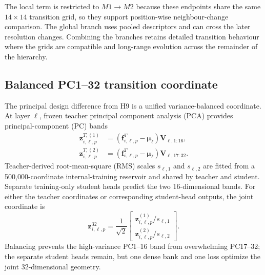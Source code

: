 The local term is restricted to $M1\rightarrow M2$ because these endpoints
share the same $14\times14$ transition grid, so they support position-wise
neighbour-change comparison. The global branch uses pooled descriptors and can
cross the later resolution changes. Combining the branches retains detailed
transition behaviour where the grids are compatible and long-range evolution
across the remainder of the hierarchy.

\subsection{Balanced PC1--32 transition coordinate}

The principal design difference from H9 is a unified variance-balanced
coordinate. At layer $\ell$, frozen teacher principal component analysis (PCA)
provides principal-component (PC) bands
\begin{align}
    \bm z_{i,\ell,p}^{T,(1)}
    &=(\bm f_{i,\ell,p}^T-\bm\mu_\ell)
      \bm V_{\ell,1:16},\\
    \bm z_{i,\ell,p}^{T,(2)}
    &=(\bm f_{i,\ell,p}^T-\bm\mu_\ell)
      \bm V_{\ell,17:32}.
\end{align}
Teacher-derived root-mean-square (RMS) scales $s_{\ell,1}$ and $s_{\ell,2}$ are fitted from a
500,000-coordinate internal-training reservoir and shared by teacher and
student. Separate training-only student heads predict the two 16-dimensional
bands. For either the teacher coordinates or corresponding student-head
outputs, the joint coordinate is
\begin{equation}
    \bm z_{i,\ell,p}^{32}
    =\frac{1}{\sqrt{2}}
      \begin{bmatrix}
      \bm z_{i,\ell,p}^{(1)}/s_{\ell,1}\\
      \bm z_{i,\ell,p}^{(2)}/s_{\ell,2}
      \end{bmatrix}.
\label{eq:j32-coordinate}
\end{equation}
Balancing prevents the high-variance PC1--16 band from overwhelming PC17--32;
the separate student heads remain, but one dense bank and one loss optimize the
joint 32-dimensional geometry.

